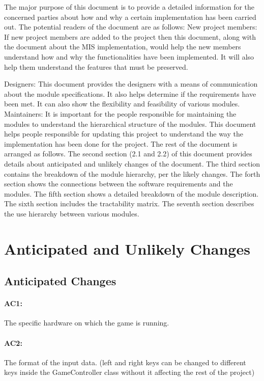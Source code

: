 \documentclass[12pt,letterpaper]{article}
\begin{document}
	The major purpose of this document is to provide a detailed information for the concerned parties about how and why a certain implementation has been carried out. The potential readers of the document are as follows:
New project members: If new project members are added to the project then this document, along with the document about the MIS implementation, would help the new members understand how and why the functionalities have been implemented. It will also help them understand the features that must be preserved.
 
	Designers: This document provides the designers with a means of communication about the module specifications. It also helps determine if the requirements have been met. It can also show the flexibility and feasibility of various modules. 
Maintainers: It is important for the people responsible for maintaining the modules to understand the hierarchical structure of the modules. This document helps people responsible for updating this project to understand the way the implementation has been done for the project. 
	The rest of the document is arranged as follows. The second section (2.1 and 2.2) of this document provides details about anticipated and unlikely changes of the document. The third section contains the breakdown of the module hierarchy, per the likely changes. The forth section shows the connections between the software requirements and the modules. The fifth section shows a detailed breakdown of the module description. The sixth section includes the tractability matrix. The seventh section describes the use hierarchy between various modules. 
	
	\section{Anticipated and Unlikely Changes}
	\subsection{Anticipated Changes}
	\paragraph{AC1:}	The specific hardware on which the game is running.
	\paragraph{AC2:}	The format of the input data. (left and right keys can be changed to different keys inside the GameController class without it affecting the rest of the project)
\end{document}
